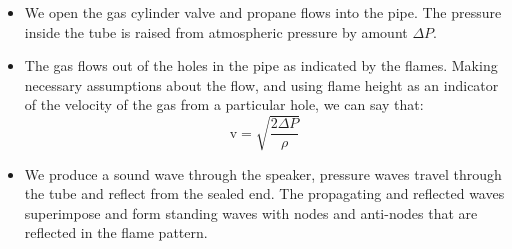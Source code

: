 \documentclass[12pt,a4paper]{article}
\begin{document}
\begin{itemize}
\item We open the gas cylinder valve and propane flows into the pipe. The pressure inside the tube is raised from atmospheric pressure by amount $\Delta P$.
\item The gas flows out of the holes in the pipe as indicated by the flames. Making necessary assumptions about the flow, and using flame height as an indicator of the velocity of the gas from a particular hole, we can say that:
\begin{equation}
    \text{v} = \sqrt{\frac{\text{$2 \Delta P$}}{\text{$\rho$}}}
\end{equation}
\item We produce a sound wave through the speaker, pressure waves travel through the tube and reflect from the sealed end. The propagating and reflected waves superimpose and form standing waves with nodes and anti-nodes that are reflected in the flame pattern.
\end{itemize}
\end{document}
